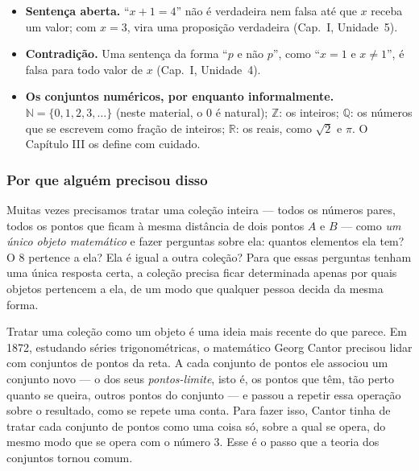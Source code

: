 \begin{minimo}
\begin{itemize}[leftmargin=1.4em,itemsep=1pt]
  \item \textbf{Sentença aberta.} \enquote{$x+1=4$} não é verdadeira nem falsa até que $x$ receba um valor; com $x=3$, vira uma proposição verdadeira (Cap.~I, Unidade~5).
  \item \textbf{Contradição.} Uma sentença da forma \enquote{$p$ e não $p$}, como \enquote{$x=1$ e $x\neq1$}, é falsa para todo valor de $x$ (Cap.~I, Unidade~4).
  \item \textbf{Os conjuntos numéricos, por enquanto informalmente.} $\mathbb{N}=\{0,1,2,3,\ldots\}$ (neste material, o 0 é natural); $\mathbb{Z}$: os inteiros; $\mathbb{Q}$: os números que se escrevem como fração de inteiros; $\mathbb{R}$: os reais, como $\sqrt2$ e $\pi$. O Capítulo III os define com cuidado.
\end{itemize}
\end{minimo}

\DeOndeVem

\subsubsection{Por que alguém precisou disso}
Muitas vezes precisamos tratar uma coleção inteira — todos os números pares, todos os pontos que ficam à mesma distância de dois pontos $A$ e $B$ — como \emph{um único objeto matemático} e fazer perguntas sobre ela: quantos elementos ela tem? O 8 pertence a ela? Ela é igual a outra coleção? Para que essas perguntas tenham uma única resposta certa, a coleção precisa ficar determinada apenas por quais objetos pertencem a ela, de um modo que qualquer pessoa decida da mesma forma.

Tratar uma coleção como um objeto é uma ideia mais recente do que parece. Em 1872, estudando séries trigonométricas, o matemático Georg Cantor precisou lidar com conjuntos de pontos da reta. A cada conjunto de pontos ele associou um conjunto novo — o dos seus \emph{pontos-limite}, isto é, os pontos que têm, tão perto quanto se queira, outros pontos do conjunto — e passou a repetir essa operação sobre o resultado, como se repete uma conta. Para fazer isso, Cantor tinha de tratar cada conjunto de pontos como uma coisa só, sobre a qual se opera, do mesmo modo que se opera com o número 3. Esse é o passo que a teoria dos conjuntos tornou comum.

